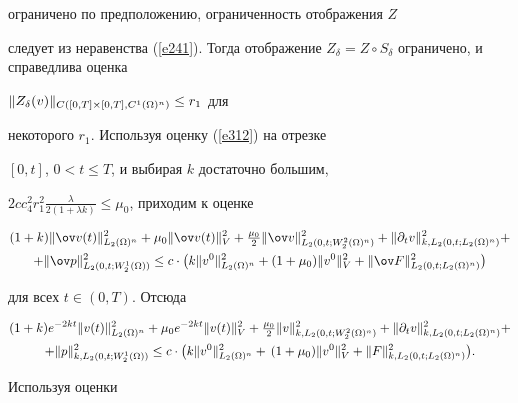 \begin{pf}
ограничено по предположению, ограниченность отображения $Z$


следует из неравенства (\ref{e241}). Тогда отображение $Z_{\delta}


=Z \circ S_{\delta}$ ограничено, и справедлива оценка


$\|Z_{\delta}(v)\|_{C([0,T]\times [0,T],C^1(\Omega)^n)} \le r_1$ для


некоторого $r_1$. Используя оценку (\ref{e312}) на отрезке


$[0,t]$, $0<t\le T$, и выбирая $k$ достаточно большим,


$2c c_4^2 r_1^2{\frac{\lambda}{2(1+\lambda k)}}\le\mu_0$, приходим к оценке


\begin{multline*}


(1+k)\|\ov v(t)\|_{L_2(\Om)^n}^2+\mu_0 \|\ov


v(t)\|_V^2+\tfrac{\mu_0}{2}\|\ov


v\|_{L_2(0,t;W_2^2(\Om)^n)}^2+\|\partial_t


v\|_{k,L_2(0,t;L_2(\Om)^n)}^2+\\


%


+\|\ov p\|_{L_2(0,t;W_2^1(\Om))}^2 \le c \cdot


\big(k\|v^0\|_{L_2(\Om)^n}^2+(1+\mu_0) \|v^0\|_V^2+


\|\ov F\|_{L_2(0,t;L_2(\Om)^n)}^2\big)


\end{multline*}


для всех $t \in (0,T)$. Отсюда


\begin{multline*}


(1+k)e^{-2kt} \|v(t)\|_{L_2(\Om)^n}^2 +\mu_0


e^{-2kt}\|v(t)\|_V^2+


\tfrac{\mu_0}{2}\|v\|_{k,L_2(0,t;W_2^2(\Om)^n)}^2 +


\|\partial_t v\|_{k,L_2(0,t;L_2(\Om)^n)}^2 +\\


%


+\|p\|_{k,L_2(0,t;W_2^1(\Om))}^2 \le c \cdot


\big(k\|v^0\|_{L_2(\Om)^n}^2+\,(1+\mu_0) \|v^0\|_V^2+


\|F\|_{k,L_2(0,t;L_2(\Om)^n)}^2\big).


\end{multline*}


Используя оценки



\end{pf}
